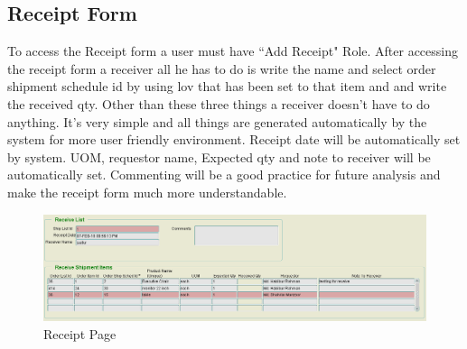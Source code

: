 \documentclass[12pt]{report} %
\begin{document}
\begin{landscape}
\section{Receipt Form}
To access the Receipt form a user must have ``Add Receipt" Role. After accessing the receipt form a receiver all he has to do is write the name and select order shipment schedule id by using lov that has been set to that item and and write the received qty. Other than these three things a receiver doesn't have to do anything. It's very simple and all things are generated automatically by the system for more user friendly environment. Receipt date will be automatically set by system. UOM, requestor name, Expected qty and note to receiver will be automatically set. Commenting will be a good practice for future analysis and make the receipt form much more understandable.
\begin{figure}[h]
	\begin{center}
	\includegraphics[width=1.35\textwidth]{pic/receipt_list_page.PNG}
	\end{center}
	\caption{Receipt Page}
	\label{fig:receipt_list_page}
\end{figure}
\thispagestyle{empty} 
\end{landscape}
\clearpage



\restoregeometry





\end{document}
